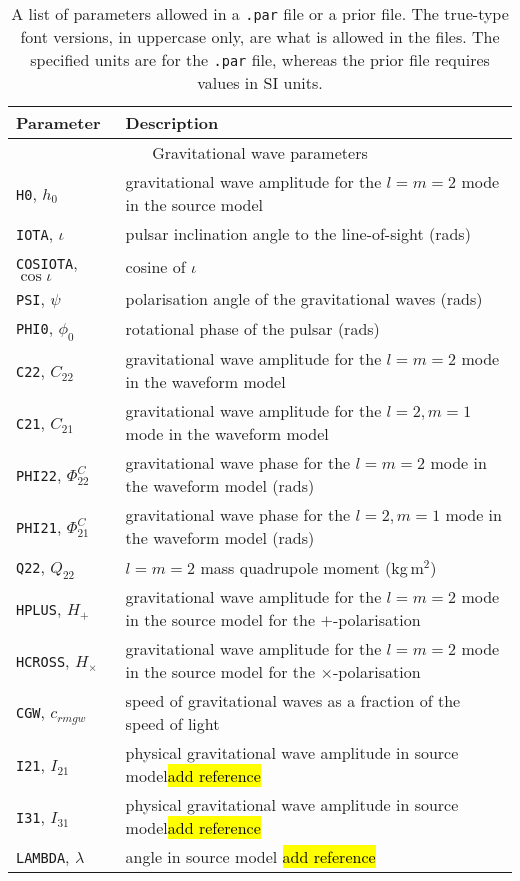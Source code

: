 \begin{longtable}{l|l}
\caption{A list of parameters allowed in a {\tt .par} file or a prior file. The true-type font versions, in uppercase only,
are what is allowed in the files. The specified units are for the {\tt .par} file, whereas the prior file
requires values in SI units.}\label{tab:paramlist} \\
Parameter & Description \\
\hline
\multicolumn{2}{c}{Gravitational wave parameters} \\
\hline
{\tt H0}, $h_0$      & gravitational wave amplitude for the $l=m=2$ mode in the source model \\
{\tt IOTA}, $\iota$  & pulsar inclination angle to the line-of-sight (rads) \\
{\tt COSIOTA}, $\cos{\iota}$ & cosine of $\iota$ \\
{\tt PSI}, $\psi$    & polarisation angle of the gravitational waves (rads) \\
{\tt PHI0}, $\phi_0$ & rotational phase of the pulsar (rads) \\
{\tt C22}, $C_{22}$  & gravitational wave amplitude for the $l=m=2$ mode in the waveform model \\
{\tt C21}, $C_{21}$  & gravitational wave amplitude for the $l=2, m=1$ mode in the waveform model \\
{\tt PHI22}, $\Phi_{22}^C$ & gravitational wave phase for the $l=m=2$ mode in the waveform model (rads) \\
{\tt PHI21}, $\Phi_{21}^C$ & gravitational wave phase for the $l=2, m=1$ mode in the waveform model (rads) \\
{\tt Q22}, $Q_{22}$ & $l=m=2$ mass quadrupole moment (kg\,m$^{2}$) \\
{\tt HPLUS}, $H_+$ &  gravitational wave amplitude for the $l=m=2$ mode in the source model for the $+$-polarisation \\
{\tt HCROSS}, $H_{\times}$ &  gravitational wave amplitude for the $l=m=2$ mode in the source model for the $\times$-polarisation \\
{\tt CGW}, $c_{rm gw}$ & speed of gravitational waves as a fraction of the speed of light \\
{\tt I21}, $I_{21}$ & physical gravitational wave amplitude in source model\hl{add reference} \\
{\tt I31}, $I_{31}$ & physical gravitational wave amplitude in source model\hl{add reference} \\
{\tt LAMBDA}, $\lambda$ & angle in source model \hl{add reference} \\

\end{longtable}
